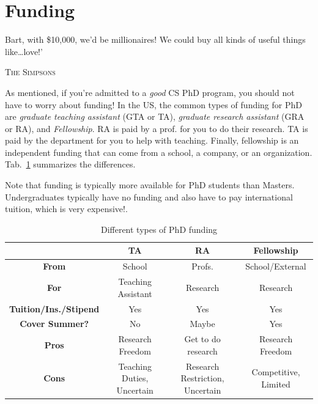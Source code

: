 \documentclass[11pt]{article}
\begin{document}
\section{Funding}\label{sec:funding}

\epigraph{Bart, with \$10,000, we’d be millionaires! We could buy all kinds of useful things like…love!’}{\textsc{The Simpsons}}

As mentioned, if you're admitted to a \emph{good} CS PhD program, you should not have to worry about funding!  
In the US, the common types of funding for PhD are \emph{graduate teaching assistant} (GTA or TA), \emph{graduate research assistant} (GRA or RA), and \emph{Fellowship}.
RA is paid by a prof. for you to do their research. TA is paid by the department for you to help with teaching. Finally, fellowship is an independent funding that can come from a school, a company, or an organization. Tab.~\ref{tab:funding} summarizes the differences.


Note that funding is typically more available for PhD students than 
Masters. Undergraduates typically have no funding and also have to pay international tuition, which is very expensive!.  

\begin{table}
  \centering
  \footnotesize
  \caption{Different types of PhD funding}\label{tab:funding}
  \begin{tabular}{c|c|c|c}
    \toprule
    &\textbf{TA}&\textbf{RA}&\textbf{Fellowship}\\
    \midrule
    \textbf{From} & School & Profs. & School/External\\
    \textbf{For}                  & Teaching Assistant       & Research                        & Research                              \\
    \textbf{Tuition/Ins./Stipend} & Yes                      & Yes                             & Yes                                   \\
    \textbf{Cover Summer?}              & No                       & Maybe                           & Yes                                   \\
    \midrule
    \textbf{Pros}                 & Research Freedom         & Get to do research              & Research Freedom                      \\
    \textbf{Cons}                 & Teaching Duties, Uncertain            & Research Restriction, Uncertain & Competitive, Limited             \\
    \bottomrule
  \end{tabular}
\end{table}
\end{document}
